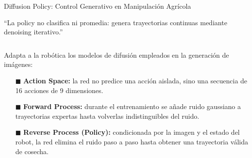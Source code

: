 \documentclass[aspectratio=169,10pt,xcolor={dvipsnames,table}]{beamer}
\newcommand{\BannerFont}{\fontsize{7.5}{9.2}\selectfont\bfseries}       %
\newcommand{\CardTitleFont}{\fontsize{7.5}{9}\selectfont\bfseries}      %
\newcommand{\BodyFont}{\fontsize{6.2}{7.8}\selectfont}                  %
\newcommand{\CardArc}{2pt}                 %
\newcommand{\CardRule}{0.6pt}              %
\newcommand{\BannerArc}{1.5pt}             %
\newcommand{\BannerRule}{0.5pt}            %
\newcommand{\BannerLeftRule}{2.5pt}        %
\newcommand{\CardHeightDouble}{42.5mm}     %
\newcommand{\BannerCentral}[2][UCNCyan]{%
  \begin{tcolorbox}[
    enhanced,
    colback=#1!10,
    colframe=#1,
    boxrule=\BannerRule,
    leftrule=\BannerLeftRule,
    arc=\BannerArc,
    top=0.35mm, bottom=0.35mm, left=2mm, right=2mm
  ]
    {\BannerFont\raggedright\textcolor{UCNBlue}{#2}\par}
  \end{tcolorbox}%
  \vspace{-2.5mm}%
}
\newcommand{\BannerRef}[1]{{\mdseries\fontsize{5}{6}\selectfont\textcolor{TextDark!65}{\cite{#1}}}} %
\begin{document}
\begin{frame}{Diffusion Policy: Control Generativo en Manipulación Agrícola}
  \BannerCentral[UCNCyan]{``La policy no clasifica ni promedia: genera trayectorias continuas mediante denoising iterativo.'' \BannerRef{sohl2015deep,ho2020ddpm,chi2025diffusion}}
  \vspace{0.8mm}
  \begin{columns}[T, onlytextwidth]
    \begin{column}{0.58\textwidth}
      \begin{tcolorbox}[
        enhanced,
        colback=WhiteBg,
        colframe=UCNBlue,
        arc=\CardArc,
        boxrule=\CardRule,
        height=\CardHeightDouble,
        title={\CardTitleFont El Concepto de Denoising Diffusion en Agro-Robótica},
        colbacktitle=UCNBlue,
        coltitle=WhiteBg,
        top=1.2mm, bottom=1.2mm, left=1.8mm, right=1.8mm
      ]
        {\BodyFont
        Adapta a la robótica los modelos de difusión empleados en la generación de imágenes:
        \vspace{1mm}
        \begin{itemize}\setlength{\itemsep}{1.8pt}
          \item[\textcolor{UCNCyan}{$\blacksquare$}] \textbf{Action Space:} la red no predice una acción aislada, sino una secuencia de 16 acciones de 9 dimensiones.
          \item[\textcolor{UCNCyan}{$\blacksquare$}] \textbf{Forward Process:} durante el entrenamiento se añade ruido gaussiano a trayectorias expertas hasta volverlas indistinguibles del ruido.
          \item[\textcolor{UCNCyan}{$\blacksquare$}] \textbf{Reverse Process (Policy):} condicionada por la imagen y el estado del robot, la red elimina el ruido paso a paso hasta obtener una trayectoria válida de cosecha.
        \end{itemize}}
      \end{tcolorbox}
    \end{column}


\end{columns}
\end{frame}
\end{document}
